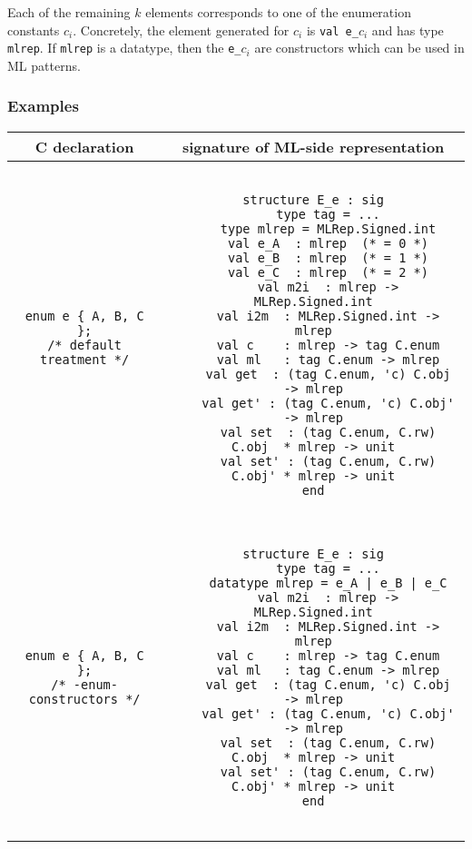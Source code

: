 \documentclass[titlepage,letterpaper]{article}
\begin{document}
Each of the remaining $k$ elements corresponds to one of the
enumeration constants $c_i$.  Concretely, the element generated for
$c_i$ is {\tt val e\_$c_i$} and has type {\tt mlrep}.  If {\tt mlrep}
is a datatype, then the {\tt e\_$c_i$} are constructors which can be
used in ML patterns.

\subsubsection*{Examples}

\begin{small}
\begin{center}
\begin{tabular}{c|c}
C declaration & signature of ML-side representation \\ \hline\hline
\begin{minipage}{2in}
\begin{verbatim}
enum e { A, B, C };
/* default treatment */
\end{verbatim}
\end{minipage}
&
\begin{minipage}{4in}
\begin{verbatim}

structure E_e : sig
    type tag = ...
    type mlrep = MLRep.Signed.int
    val e_A  : mlrep  (* = 0 *)
    val e_B  : mlrep  (* = 1 *)
    val e_C  : mlrep  (* = 2 *)
    val m2i  : mlrep -> MLRep.Signed.int
    val i2m  : MLRep.Signed.int -> mlrep
    val c    : mlrep -> tag C.enum
    val ml   : tag C.enum -> mlrep
    val get  : (tag C.enum, 'c) C.obj  -> mlrep
    val get' : (tag C.enum, 'c) C.obj' -> mlrep
    val set  : (tag C.enum, C.rw) C.obj  * mlrep -> unit
    val set' : (tag C.enum, C.rw) C.obj' * mlrep -> unit
end

\end{verbatim}
\end{minipage}
\\ \hline
\begin{minipage}{2in}
\begin{verbatim}
enum e { A, B, C };
/* -enum-constructors */
\end{verbatim}
\end{minipage}
&
\begin{minipage}{4in}
\begin{verbatim}

structure E_e : sig
    type tag = ...
    datatype mlrep = e_A | e_B | e_C
    val m2i  : mlrep -> MLRep.Signed.int
    val i2m  : MLRep.Signed.int -> mlrep
    val c    : mlrep -> tag C.enum
    val ml   : tag C.enum -> mlrep
    val get  : (tag C.enum, 'c) C.obj  -> mlrep
    val get' : (tag C.enum, 'c) C.obj' -> mlrep
    val set  : (tag C.enum, C.rw) C.obj  * mlrep -> unit
    val set' : (tag C.enum, C.rw) C.obj' * mlrep -> unit
end


\end{verbatim}
\end{minipage}
\end{tabular}
\end{center}
\end{small}
\end{document}
